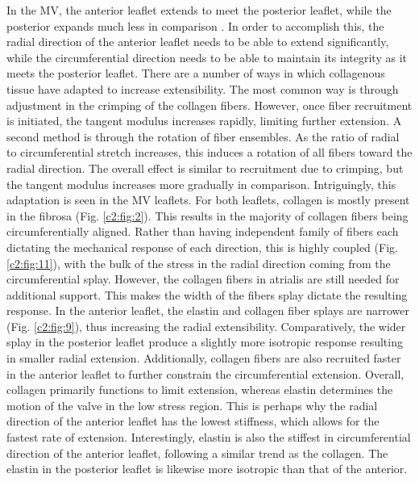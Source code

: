     In the MV, the anterior leaflet extends to meet the posterior leaflet, while the posterior expands much less in comparison \cite{amini_vivo_2012,rausch_vivo_2011}. In order to accomplish this, the radial direction of the anterior leaflet needs to be able to extend significantly, while the circumferential direction needs to be able to maintain its integrity as it meets the posterior leaflet. There are a number of ways in which collagenous tissue have adapted to increase extensibility. The most common way is through adjustment in the crimping of the collagen fibers. However, once fiber recruitment is initiated, the tangent modulus increases rapidly, limiting further extension. A second method is through the rotation of fiber ensembles. As the ratio of radial to circumferential stretch increases, this induces a rotation of all fibers toward the radial direction. The overall effect is similar to recruitment due to crimping, but the tangent modulus increases more gradually in comparison. Intriguingly, this adaptation is seen in the MV leaflets. For both leaflets, collagen is mostly present in the fibrosa (Fig. \ref{c2:fig:2}). This results in the majority of collagen fibers being circumferentially aligned. Rather than having independent family of fibers each dictating the mechanical response of each direction, this is highly coupled (Fig. \ref{c2:fig:11}), with the bulk of the stress in the radial direction coming from the circumferential splay. However, the collagen fibers in atrialis are still needed for additional support. This makes the width of the fibers splay dictate the resulting response. In the anterior leaflet, the elastin and collagen fiber splays are narrower (Fig. \ref{c2:fig:9}), thus increasing the radial extensibility. Comparatively, the wider splay in the posterior leaflet produce a slightly more isotropic response resulting in smaller radial extension. Additionally, collagen fibers are also recruited faster in the anterior leaflet to further constrain the circumferential extension. Overall, collagen primarily functions to limit extension, whereas elastin determines the motion of the valve in the low stress region. This is perhaps why the radial direction of the anterior leaflet has the lowest stiffness, which allows for the fastest rate of extension. Interestingly, elastin is also the stiffest in circumferential direction of the anterior leaflet, following a similar trend as the collagen. The elastin in the posterior leaflet is likewise more isotropic than that of the anterior.
    
    
    
